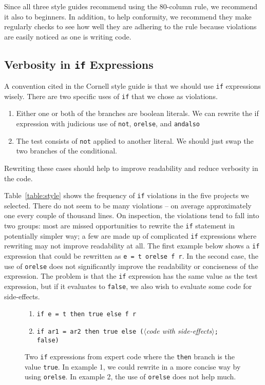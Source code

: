 \documentclass[12pt,abstracton]{scrartcl}
\begin{document}
Since all three style guides recommend using the 80-column rule, we recommend it
also to beginners. In addition, to help conformity, we recommend they make
regularly checks to see how well they are adhering to the rule because
violations are easily noticed as one is writing code.
\subsection{Verbosity in \texttt{if} Expressions}
A convention cited in the Cornell style guide is that we should use \texttt{if}
expressions wisely. There are two specific uses of \texttt{if} that we
chose as violations.
\begin{enumerate}
\item Either one or both of the branches are boolean literals. We can rewrite the if expression with judicious use of \texttt{not}, \texttt{orelse}, and \texttt{andalso}
\item The test consists of \texttt{not} applied to another literal. We should just swap the two branches of the conditional.
\end{enumerate}
Rewriting these cases should help to improve readability and reduce verbosity in the code.

Table~\ref{table:style} shows the frequency of \texttt{if} violations in the five projects we selected.
There do not seem to be many violations -- on average approximately one every couple of thousand lines.
On inspection, the violations tend to fall into two groups: most are
missed opportunities to rewrite the \texttt{if} statement in potentially simpler way;
a few are made up of complicated \texttt{if} expressions where rewriting may not improve readability at all.
The first example below shows a \texttt{if} expression that could be rewritten as \texttt{e = t orelse f r}.
In the second case, the use of \texttt{orelse} does not significantly improve the readability or conciseness
of the expression. The problem is that the \texttt{if} expression has the same value as the test expression,
but if it evaluates to \texttt{false}, we also wish to evaluate some code for side-effects.

\begin{figure}[h!]
\begin{enumerate}
\item \texttt{if e = t then true else f r}
\item \texttt{if ar1 = ar2 then true else (}$\langle$\emph{code with side-effects}$\rangle$\texttt{; false)}
\end{enumerate}
\caption{Two \texttt{if} expressions from expert code where the \texttt{then} branch is the value \texttt{true}. In example 1, we could
rewrite in a more concise way by using \texttt{orelse}. In example 2, the use of \texttt{orelse} does not help much.}
\label{figure:ifthentrue}
\end{figure}
\end{document}
